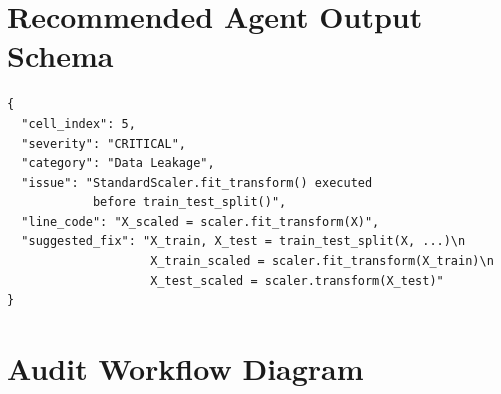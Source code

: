 \documentclass[11pt,a4paper]{article}
\begin{document}
\section{Recommended Agent Output Schema}

\begin{lstlisting}
{
  "cell_index": 5,
  "severity": "CRITICAL",
  "category": "Data Leakage",
  "issue": "StandardScaler.fit_transform() executed
            before train_test_split()",
  "line_code": "X_scaled = scaler.fit_transform(X)",
  "suggested_fix": "X_train, X_test = train_test_split(X, ...)\n
                    X_train_scaled = scaler.fit_transform(X_train)\n
                    X_test_scaled = scaler.transform(X_test)"
}
\end{lstlisting}

\clearpage

\section{Audit Workflow Diagram}
\end{document}
